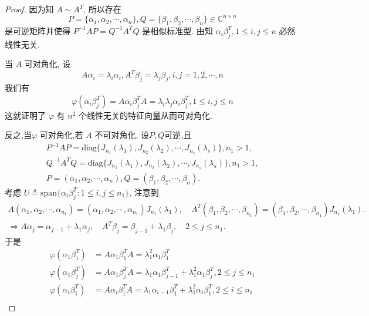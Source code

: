 \documentclass[../../main.tex]{subfiles}
\begin{document}
\begin{proof}
因为知 $A \sim A^T$, 所以存在
$$P = \{\alpha_1, \alpha_2, \cdots, \alpha_n\}, Q = \{\beta_1, \beta_2, \cdots, \beta_n\} \in \mathbb{C}^{n \times n}$$
是可逆矩阵并使得 $P^{-1}AP = Q^{-1}A^TQ$ 是相似标准型. 由知 $\alpha_i \beta_j^T, 1 \leqslant  i, j \leqslant  n$ 必然线性无关.

当 $A$ 可对角化, 设
$$A\alpha_i = \lambda_i \alpha_i, A^T \beta_j = \lambda_j \beta_j, i, j = 1, 2, \cdots, n$$
我们有
$$\varphi(\alpha_i \beta_j^T) = A\alpha_i \beta_j^T A = \lambda_i \lambda_j \alpha_i \beta_j^T, 1 \leqslant  i, j \leqslant  n$$
这就证明了 $\varphi$ 有 $n^2$ 个线性无关的特征向量从而可对角化.

反之,当$\varphi$ 可对角化,若 $A$ 不可对角化, 设$P,Q$可逆,且
\begin{gather*}
P^{-1}AP=\mathrm{diag}\{J_{n_1}(\lambda _1),J_{n_2}(\lambda _2),\cdots ,J_{n_s}(\lambda _s)\},n_1>1,
\\
Q^{-1}A^TQ=\mathrm{diag}\{J_{n_1}(\lambda _1),J_{n_2}(\lambda _2),\cdots ,J_{n_s}(\lambda _s)\},n_1>1,
\\
P=\left( \alpha _1,\alpha _2,\cdots ,\alpha _n \right) ,Q=\left( \beta _1,\beta _2,\cdots ,\beta _n \right) .
\end{gather*}
考虑 $U \triangleq \mathrm{span}\{\alpha_i \beta_j^T : 1 \leqslant  i, j \leqslant  n_1\}$, 注意到
\begin{gather*}
A\left( \alpha _1,\alpha _2,\cdots ,\alpha _{n_1} \right) =\left( \alpha _1,\alpha _2,\cdots ,\alpha _{n_1} \right) J_{n_1}\left( \lambda _1 \right) ,\quad A^T\left( \beta _1,\beta _2,\cdots ,\beta _{n_1} \right) =\left( \beta _1,\beta _2,\cdots ,\beta _{n_1} \right) J_{n_1}\left( \lambda _1 \right) .
\\
\Rightarrow A\alpha _j=\alpha _{j-1}+\lambda _1\alpha _j,\quad A^T\beta _j=\beta _{j-1}+\lambda _1\beta _j,\quad 2\leqslant j\leqslant n_1.
\end{gather*}
于是
\begin{align*}
\varphi(\alpha_1 \beta_1^T) &= A\alpha_1 \beta_1^T A = \lambda_1^2 \alpha_1 \beta_1^T \\
\varphi(\alpha_1 \beta_j^T) &= A\alpha_1 \beta_j^T A = \lambda_1 \alpha_1 \beta_{j - 1}^T + \lambda_1^2 \alpha_1 \beta_j^T, 2 \leqslant  j \leqslant  n_1 \\
\varphi(\alpha_i \beta_1^T) &= A\alpha_i \beta_1^T A = \lambda_1 \alpha_{i - 1} \beta_1^T + \lambda_1^2 \alpha_i \beta_1^T, 2 \leqslant  i \leqslant  n_1 \\

\end{align*}
\end{proof}
\end{document}
